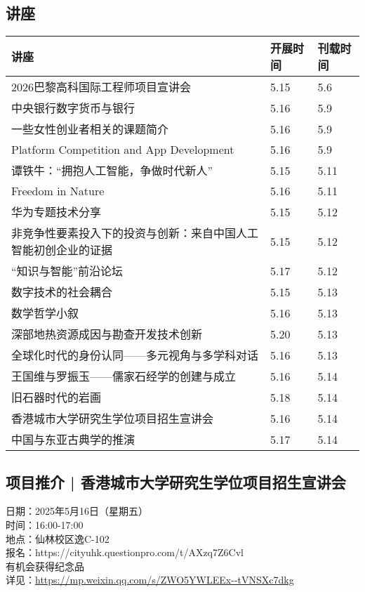 \documentclass[letterpaper, 12pt]{article}
\begin{document}
\begin{multicols}{2}
\pagebreak

\section{讲座}
\begin{tabular}{|>{\centering\arraybackslash}m{}|m{}|m{}|}
    \hline
    讲座 & 开展时间 & 刊载时间\\
    \hline\hline
    2026巴黎高科国际工程师项目宣讲会 & 5.15 & 5.6\\\hline
    中央银行数字货币与银行 & 5.16 & 5.9\\\hline
    一些女性创业者相关的课题简介 & 5.16 & 5.9\\\hline
    Platform Competition and App Development & 5.16 & 5.9\\\hline
    谭铁牛：“拥抱人工智能，争做时代新人” & 5.15 & 5.11\\\hline
    Freedom in Nature & 5.16 & 5.11\\\hline
    华为专题技术分享 & 5.15 & 5.12\\\hline
    非竞争性要素投入下的投资与创新：来自中国人工智能初创企业的证据 & 5.15 & 5.12\\\hline
    “知识与智能”前沿论坛 & 5.17 & 5.12\\\hline
    数字技术的社会耦合 & 5.15 & 5.13\\\hline
    数学哲学小叙 & 5.16 & 5.13\\\hline
    深部地热资源成因与勘查开发技术创新 & 5.20 & 5.13\\\hline
    全球化时代的身份认同——多元视角与多学科对话 & 5.16 & 5.13\\\hline
    王国维与罗振玉——儒家石经学的创建与成立 & 5.16 & 5.14\\\hline
    旧石器时代的岩画 & 5.18 & 5.14\\\hline
    香港城市大学研究生学位项目招生宣讲会 & 5.16 & 5.14\\\hline
    中国与东亚古典学的推演 & 5.17 & 5.14\\\hline
    \end{tabular}
\subsection{项目推介 | 香港城市大学研究生学位项目招生宣讲会} %
日期：2025年5月16日（星期五）
\\时间：16:00-17:00
\\地点：仙林校区逸C-102
\\报名：https://cityuhk.questionpro.com/t/AXzq7Z6Cvl
\\有机会获得纪念品
\\详见：\url{https://mp.weixin.qq.com/s/ZWO5YWLEEx--tVNSXc7dkg}

\end{multicols}
\end{document}
